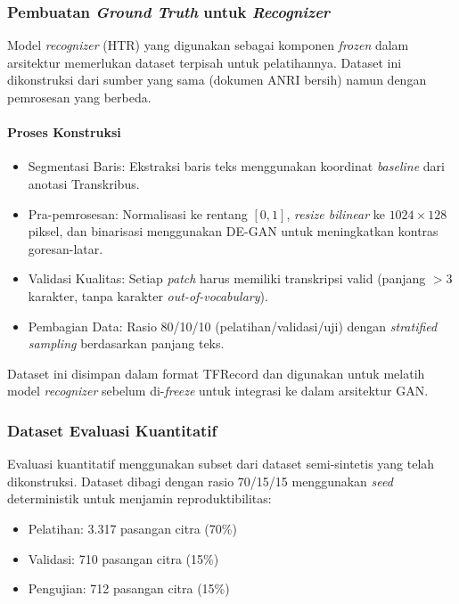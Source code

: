 \subsubsection{Pembuatan \textit{Ground Truth} untuk \textit{Recognizer}}
\label{subsec:implementasi-pipeline}

Model \textit{recognizer} (HTR) yang digunakan sebagai komponen \textit{frozen} dalam arsitektur memerlukan dataset terpisah untuk pelatihannya. Dataset ini dikonstruksi dari sumber yang sama (dokumen ANRI bersih) namun dengan pemrosesan yang berbeda.

\paragraph{Proses Konstruksi}
\begin{itemize}[leftmargin=1.5em, labelsep=0.5em, noitemsep, topsep=0pt]
  \item Segmentasi Baris: Ekstraksi baris teks menggunakan koordinat \textit{baseline} dari anotasi Transkribus.
  \item Pra-pemrosesan: Normalisasi ke rentang $[0,1]$, \textit{resize bilinear} ke $1024 \times 128$ piksel, dan binarisasi menggunakan DE-GAN untuk meningkatkan kontras goresan-latar.
  \item Validasi Kualitas: Setiap \textit{patch} harus memiliki transkripsi valid (panjang $> 3$ karakter, tanpa karakter \textit{out-of-vocabulary}).
  \item Pembagian Data: Rasio 80/10/10 (pelatihan/validasi/uji) dengan \textit{stratified sampling} berdasarkan panjang teks.
\end{itemize}

Dataset ini disimpan dalam format TFRecord dan digunakan untuk melatih model \textit{recognizer} sebelum di-\textit{freeze} untuk integrasi ke dalam arsitektur GAN.

\subsubsection{Dataset Evaluasi Kuantitatif}

Evaluasi kuantitatif menggunakan subset dari dataset semi-sintetis yang telah dikonstruksi. Dataset dibagi dengan rasio 70/15/15 menggunakan \textit{seed} deterministik untuk menjamin reproduktibilitas:
\begin{itemize}[leftmargin=1.5em, labelsep=0.5em, noitemsep, topsep=0pt]
  \item Pelatihan: 3.317 pasangan citra (70\%)
  \item Validasi: 710 pasangan citra (15\%)
  \item Pengujian: 712 pasangan citra (15\%)
\end{itemize}


